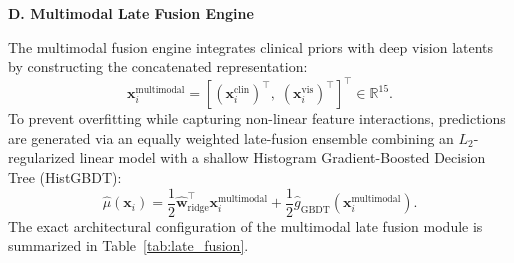\documentclass[preprint,12pt]{elsarticle}
\begin{document}
\begin{table}[!t]
\centering
\caption{Consolidated Architectural Specifications and Standalone Cross-Validation Performance of Preoperative Feature Tracks}
\label{tab:feature_tracks_config}
\end{table}

\noindent\textbf{D. Multimodal Late Fusion Engine}

The multimodal fusion engine integrates clinical priors with deep vision latents by constructing the concatenated representation:
\begin{equation}
\mathbf{x}_i^{\text{multimodal}} = \left[ (\mathbf{x}_i^{\text{clin}})^{\top},\; (\mathbf{x}_i^{\text{vis}})^{\top} \right]^{\top} \in \mathbb{R}^{15}.
\end{equation}
To prevent overfitting while capturing non-linear feature interactions, predictions are generated via an equally weighted late-fusion ensemble combining an $L_2$-regularized linear model with a shallow Histogram Gradient-Boosted Decision Tree (HistGBDT):
\begin{equation}
\hat{\mu}(\mathbf{x}_i) = \frac{1}{2}\hat{\mathbf{w}}_{\text{ridge}}^{\top}\mathbf{x}_i^{\text{multimodal}} + \frac{1}{2}\hat{g}_{\text{GBDT}}(\mathbf{x}_i^{\text{multimodal}}).
\end{equation}
The exact architectural configuration of the multimodal late fusion module is summarized in Table~\ref{tab:late_fusion}.
\end{document}
